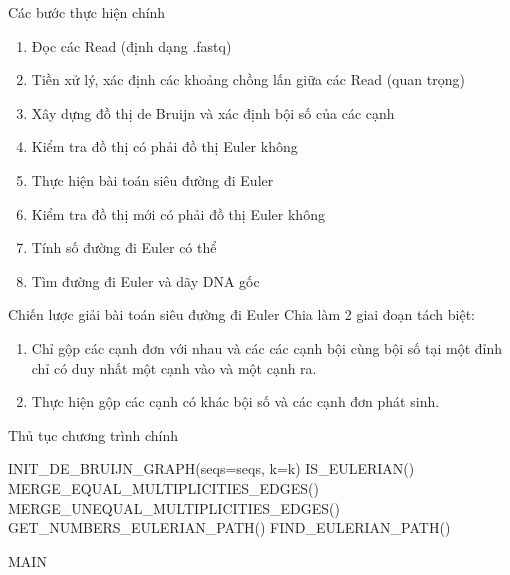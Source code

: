 \documentclass[10pt]{beamer}
\theoremstyle{remark}
\numberwithin{algocf}{section}
\numberwithin{equation}{section}
\numberwithin{dl}{section}
\numberwithin{figure}{section}
\begin{document}
\begin{frame}{Các bước thực hiện chính}
    \begin{enumerate}
        \item Đọc các Read (định dạng .fastq)
        \item Tiền xử lý, xác định các khoảng chồng lấn giữa các Read (quan trọng)
        \item Xây dựng đồ thị de Bruijn và xác định bội số của các cạnh
        \item Kiểm tra đồ thị có phải đồ thị Euler không
        \item Thực hiện bài toán siêu đường đi Euler
        \item Kiểm tra đồ thị mới có phải đồ thị Euler không
        \item Tính số đường đi Euler có thể
        \item Tìm đường đi Euler và dãy DNA gốc
    \end{enumerate}
    
\end{frame}

\begin{frame}{Chiến lược giải bài toán siêu đường đi Euler}
    Chia làm 2 giai đoạn tách biệt:

    \begin{enumerate}
        \item Chỉ gộp các cạnh đơn với nhau và các các cạnh bội cùng bội số tại một đỉnh chỉ có duy nhất một cạnh vào và một cạnh ra.
        \item Thực hiện gộp các cạnh có khác bội số và các cạnh đơn phát sinh.
    \end{enumerate}
\end{frame}


\begin{frame}{Thủ tục chương trình chính}
    \begin{algorithm}[H]
        \DontPrintSemicolon
        INIT\_DE\_BRUIJN\_GRAPH(seqs=seqs, k=k)\;
        IS\_EULERIAN()\;
        MERGE\_EQUAL\_MULTIPLICITIES\_EDGES()\;
        MERGE\_UNEQUAL\_MULTIPLICITIES\_EDGES()\;
         {
            GET\_NUMBERS\_EULERIAN\_PATH()\;
            FIND\_EULERIAN\_PATH()\;
        }
        
        \caption{MAIN}
    \end{algorithm}
    
\end{frame}
\end{document}
